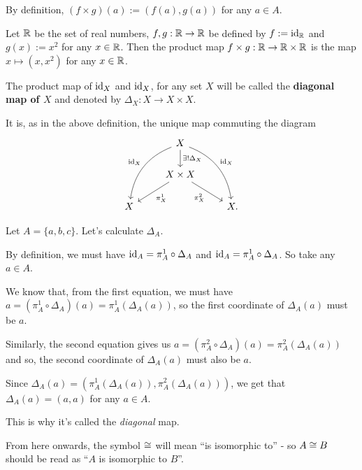 By definition, $(f\times g)(a):=(f(a),g(a))$ for any $a\in A$.

\begin{ex}
	Let $\mathbb R$ be the set of real numbers, $f,g:\mathbb R\to \mathbb R$ be defined by $f:={\rm id}_\mathbb R$ and $g(x):=x^2$ for any $x\in\mathbb R$. Then the product map $f\times g:\mathbb R\to\mathbb R\times \mathbb R$ is the map $x\mapsto(x,x^2)$ for any $x\in \mathbb R$.
\end{ex}

\begin{df}
	The product map of ${\rm id}_X$ and ${\rm id}_X$, for any set $X$ will be called the \textbf{diagonal map of $X$} and denoted by $\Delta_X:X\to X\times X$.
	
	It is, as in the above definition, the unique map commuting the diagram
	\[\begin{tikzcd}
	& X \arrow[ldd, "\id_X"', bend right] \arrow[rdd, "\id_X", bend left] \arrow[d, "\exists!\Delta_X"] &   \\
	& X\times X \arrow[ld, "\pi^1_X"] \arrow[rd, "\pi^2_X"']                                            &   \\
	X &                                                                                                   & X.
	\end{tikzcd}\]
\end{df}

\begin{ex}
	Let $A=\{a,b,c\}$. Let's calculate $\Delta_A$.
	
		By definition, we must have ${\rm id}_A=\pi^1_A\circ\Delta_A$ and ${\rm id}_A=\pi^1_A\circ\Delta_A$. So take any $a\in A$.
	
	We know that, from the first equation, we must have $a=(\pi^1_A\circ\Delta_A)(a)=\pi_A^1(\Delta_A(a))$, so the first coordinate of $\Delta_A(a)$ must be $a$.
	
	Similarly, the second equation gives us $a=(\pi^2_A\circ\Delta_A)(a)=\pi^2_A(\Delta_A(a))$ and so, the second coordinate of $\Delta_A(a)$ must also be $a$.
	
	Since $\Delta_A(a)=(\pi_A^1(\Delta_A(a)),\pi_A^2(\Delta_A(a)))$, we get that $\Delta_A(a)=(a,a)$ for any $a\in A$.
	
	This is why it's called the \textit{diagonal} map.
\end{ex}

\begin{rmk}
	From here onwards, the symbol $\cong$ will mean ``is isomorphic to'' - so $A\cong B$ should be read as ``$A$ is isomorphic to $B$''.
\end{rmk}

